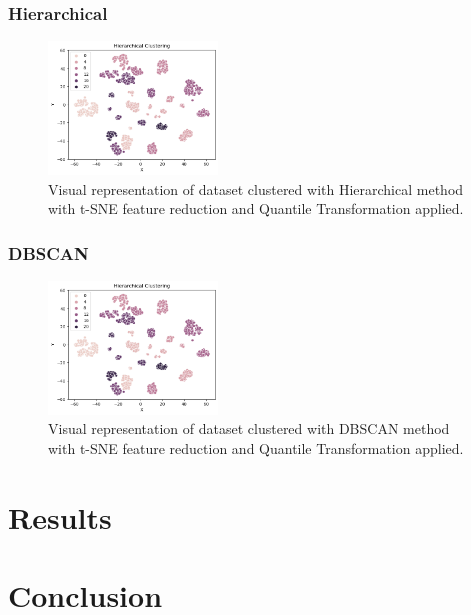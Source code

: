 \documentclass[twocolumn]{article}
\begin{document}
\subsubsection{Hierarchical}

\begin{figure}[H]
    \centering
    \includegraphics[width=0.4\textwidth]{images/hierarchical.png}
    \caption{Visual representation of dataset clustered with Hierarchical method with t-SNE feature reduction and Quantile Transformation applied.}
\end{figure}



\subsubsection{DBSCAN}

\begin{figure}[H]
    \centering
    \includegraphics[width=0.4\textwidth]{images/hierarchical.png}
    \caption{Visual representation of dataset clustered with DBSCAN method with t-SNE feature reduction and Quantile Transformation applied.}
\end{figure}
\section{Results}
\section{Conclusion}

\pagebreak

\twocolumn[
\begin{@twocolumnfalse}
\printbibliography
\end{@twocolumnfalse}
]
\end{document}

